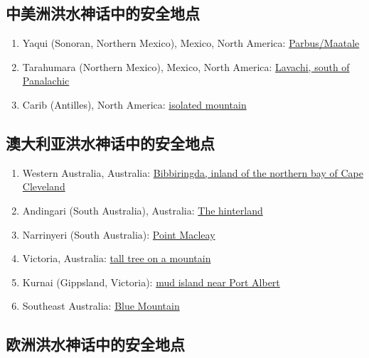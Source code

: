 \documentclass[10pt,twocolumn,letterpaper]{article}
\begin{document}
\subsection{中美洲洪水神话中的安全地点}

\begin{flushleft}
\begin{enumerate}
\item Yaqui (Sonoran, Northern Mexico), Mexico, North America: \href{http://www.talkorigins.org/faqs/flood-myths.html#Yaqui}{Parbus/Maatale}
\item Tarahumara (Northern Mexico), Mexico, North America: \href{http://www.talkorigins.org/faqs/flood-myths.html#Tarahumara}{Lavachi, south of Panalachic}
\item Carib (Antilles), North America: \href{http://www.talkorigins.org/faqs/flood-myths.html#Carib}{isolated mountain}
\end{enumerate}
\end{flushleft}

\subsection{澳大利亚洪水神话中的安全地点}

\begin{flushleft}
\begin{enumerate}
\item Western Australia, Australia: \href{http://www.talkorigins.org/faqs/flood-myths.html#MtElliot}{Bibbiringda, inland of the northern bay of Cape Cleveland}
\item Andingari (South Australia), Australia: \href{http://www.talkorigins.org/faqs/flood-myths.html#WestAustralia}{The hinterland}
\item Narrinyeri (South Australia): \href{http://www.talkorigins.org/faqs/flood-myths.html#Narrinyeri}{Point Macleay}
\item Victoria, Australia: \href{http://www.talkorigins.org/faqs/flood-myths.html#Victoria}{tall tree on a mountain}
\item Kurnai (Gippsland, Victoria): \href{http://www.talkorigins.org/faqs/flood-myths.html#Kurnai}{mud island near Port Albert}
\item Southeast Australia: \href{http://www.talkorigins.org/faqs/flood-myths.html#SEAustralia}{Blue Mountain}
\end{enumerate}
\end{flushleft}

\subsection{欧洲洪水神话中的安全地点}
\end{document}
